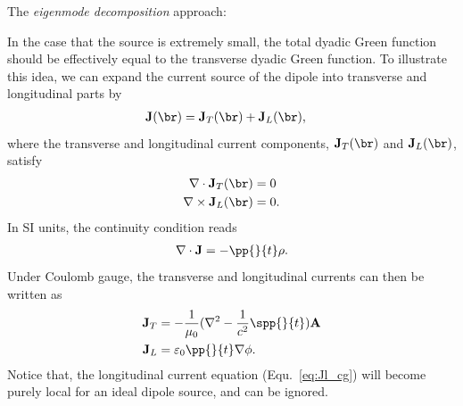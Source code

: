 \documentclass[]{report}
\begin{document}
The \textit{eigenmode decomposition} approach:

In the case that the source is extremely small, the total dyadic Green function should be effectively equal to the transverse dyadic Green function. To illustrate this idea, we can expand the current source of the dipole into transverse and longitudinal parts by
\begin{align}
\mathbf{J}(\br) &= \mathbf{J}_T(\br) + \mathbf{J}_L(\br),
\end{align}
where the transverse and longitudinal current components, $ \mathbf{J}_T(\br) $ and $\mathbf{J}_L(\br)$, satisfy
\begin{align}
\nabla\cdot\mathbf{J}_T (\br) &=0\\
\nabla\times \mathbf{J}_L (\br) &=0.
\end{align}
In SI units, the continuity condition reads
\begin{align}
\nabla\cdot\mathbf{J}=-\pp{}{t}\rho.
\end{align}
Under Coulomb gauge, the transverse and longitudinal currents can then be written as 
\begin{align}
\mathbf{J}_T &= -\frac{1}{\mu_0}(\nabla^2 -\frac{1}{c^2}\spp{}{t})\mathbf{A}\label{eq:Jt_cg}\\
\mathbf{J}_L &= \varepsilon_0 \pp{}{t}\nabla\phi .\label{eq:Jl_cg}
\end{align}
Notice that, the longitudinal current equation (Equ.~\eqref{eq:Jl_cg}) will become purely local for an ideal dipole source, and can be ignored. 
\end{document}

